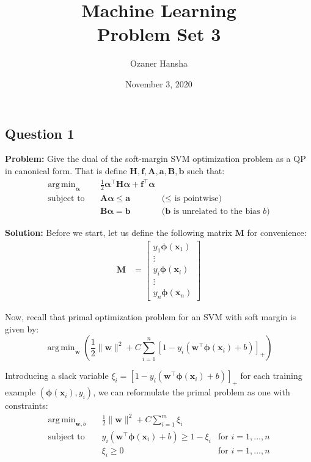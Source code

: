 \documentclass{article}
\renewcommand{\vec}[1]{\mathbf{#1}}
\newcommand{\mat}[1]{\mathbf{#1}}
\DeclareMathOperator*{\argmin}{arg\,min}
\begin{document}
\title{Machine Learning\\ Problem Set 3}
\author{Ozaner Hansha}
\date{November 3, 2020}
\maketitle

\subsection*{Question 1}
\noindent\textbf{Problem:} Give the dual of the soft-margin SVM optimization problem as a QP in canonical form. That is define $\mat H,\vec f, \mat A, \vec a, \mat B, \vec b$ such that:
$$\begin{array}{rcll}
    \displaystyle\argmin_{\bm\alpha} &~ &\displaystyle\frac{1}{2}\bm\alpha^\top\mat H\bm\alpha+\vec f^\top\bm\alpha&\\
    \text{subject to}&~ &\mat A\bm\alpha\le \vec a&\text{($\le$ is pointwise)}\\
    &~ &\mat B\bm\alpha=\vec b&\text{($\vec b$ is unrelated to the bias $b$)}
\end{array}$$
\bigskip

\noindent\textbf{Solution:} Before we start, let us define the following matrix $\mat M$ for convenience:
\begin{align*}
    \mat M&=\begin{bmatrix}
        y_1\bm\phi(\vec x_1)\\
        \vdots\\
        y_i\bm\phi(\vec x_i)\\
        \vdots\\
        y_n\bm\phi(\vec x_n)
    \end{bmatrix}
\end{align*}

Now, recall that primal optimization problem for an SVM with soft margin is given by:
$$\argmin_{\vec w}\left(\frac{1}{2}\|\vec w\|^2+C\sum_{i=1}^n[1-y_i(\vec w^\top\vec\phi(\vec x_i)+b)]_+\right)$$

Introducing a slack variable $\xi_i=[1-y_i(\vec w^\top\bm\phi(\vec x_i)+b)]_+$ for each training example $(\bm\phi(\vec x_i),y_i)$, we can reformulate the primal problem as one with constraints:
$$\begin{array}{rcll}
    \displaystyle\argmin_{\vec w,b} &~ &\displaystyle\frac{1}{2}\|\vec w\|^2+C\sum_{i=1}^m\xi_i&\\
    \text{subject to}&~ &y_i(\vec w^\top\bm{\phi}(\vec x_i)+b)\ge 1-\xi_i&\text{for }i=1,\ldots ,n\\
    &~ &\xi_i\ge0&\text{for }i=1,\ldots ,n
\end{array}$$
\end{document}
